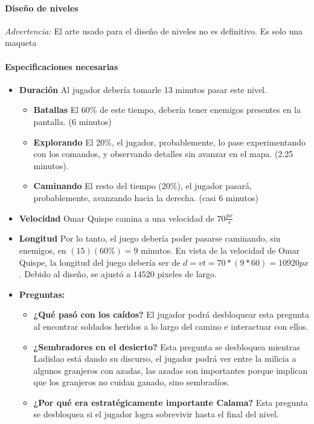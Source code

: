   \paragraph{Diseño de niveles}

  \textit{Advertencia: }El arte usado para el diseño de niveles no es definitivo. Es solo una maqueta

  \paragraph{Especificaciones necesarias}

  \begin{itemize}

  \item \textbf{Duración }Al jugador debería tomarle 13 minutos pasar este nivel.
    \begin{itemize}
    \item \textbf{Batallas} El 60\% de este tiempo, debería tener enemigos presentes en la pantalla. (6 minutos)
    \item \textbf{Explorando} El 20\%, el jugador, probablemente, lo pase experimentando con los comandos, y observando detalles sin avanzar en el mapa. (2.25 minutos).
    \item \textbf{Caminando} El resto del tiempo (20\%), el jugador pasará, probablemente, avanzando hacia la derecha. (casi 6 minutos)
    \end{itemize}
  \item \textbf{Velocidad} Omar Quispe camina a una velocidad de $70\frac{px}{s}$
  \item \textbf{Longitud } Por lo tanto, el juego debería poder pasarse caminando, sin enemigos, en $(15)(60\%) = 9$ minutos. En vista de la velocidad de Omar Quispe, la longitud del juego debería ser de $d = vt = 70 * (9*60) = 10920 px$. Debido al diseño, se ajustó a $14520$ pixeles de largo.

  \item \textbf{Preguntas: }
    \begin{itemize}
    \item \textbf{¿Qué pasó con los caídos?} El jugador podrá desbloquear esta pregunta al encontrar soldados heridos a lo largo del camino e interactuar con ellos.
    \item \textbf{¿Sembradores en el desierto?} Esta pregunta se desbloquea mientras Ladislao está dando su discurso, el jugador podrá ver entre la milicia a algunos granjeros con azadas, las azadas son importantes porque implican que los granjeros no cuidan ganado, sino sembradíos.
    \item \textbf{¿Por qué era estratégicamente importante Calama?} Esta pregunta se desbloquea si el jugador logra sobrevivir hasta el final del nivel.
    \end{itemize}    

  \end{itemize}

